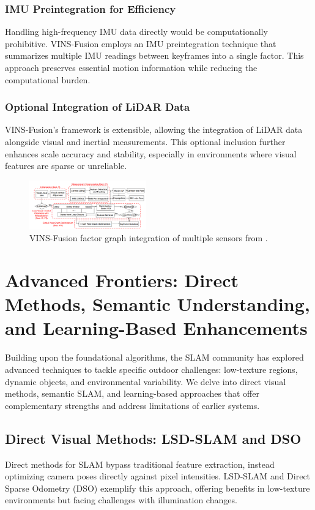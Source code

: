 \documentclass[conference]{IEEEtran}
\begin{document}
\subsubsection{IMU Preintegration for Efficiency}
Handling high-frequency IMU data directly would be computationally prohibitive. VINS-Fusion employs an IMU preintegration technique that summarizes multiple IMU readings between keyframes into a single factor. This approach preserves essential motion information while reducing the computational burden.

\subsubsection{Optional Integration of LiDAR Data}
VINS-Fusion’s framework is extensible, allowing the integration of LiDAR data alongside visual and inertial measurements. This optional inclusion further enhances scale accuracy and stability, especially in environments where visual features are sparse or unreliable.

\begin{figure}[htbp]
\centerline{\includegraphics[width=0.45\textwidth]{vins_fusion.png}}
\caption{VINS-Fusion factor graph integration of multiple sensors from \cite{3}.}
\label{fig:vins_fusion}
\end{figure}

\section{Advanced Frontiers: Direct Methods, Semantic Understanding, and Learning-Based Enhancements}
Building upon the foundational algorithms, the SLAM community has explored advanced techniques to tackle specific outdoor challenges: low-texture regions, dynamic objects, and environmental variability. We delve into direct visual methods, semantic SLAM, and learning-based approaches that offer complementary strengths and address limitations of earlier systems.

\subsection{Direct Visual Methods: LSD-SLAM and DSO}
Direct methods for SLAM bypass traditional feature extraction, instead optimizing camera poses directly against pixel intensities. LSD-SLAM \cite{4} and Direct Sparse Odometry (DSO) \cite{5} exemplify this approach, offering benefits in low-texture environments but facing challenges with illumination changes.
\end{document}
